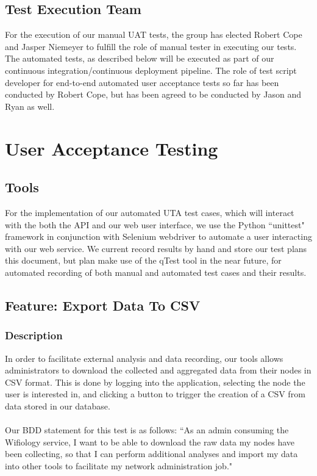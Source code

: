 \documentclass[]{article}
\begin{document}
	\subsection{Test Execution Team}
	
    For the execution of our manual UAT tests, the group has elected Robert Cope and Jasper Niemeyer to
    fulfill the role of manual tester in executing our tests. The automated tests, as described below will
    be executed as part of our continuous integration/continuous deployment pipeline. The role of test
    script developer for end-to-end automated user acceptance tests so far has been conducted by Robert Cope,
    but has been agreed to be conducted by Jason and Ryan as well.
	
	\section{User Acceptance Testing}
	\subsection{Tools}
	For the implementation of our automated UTA test cases, which will interact with the both the API and our web user interface,
	we use the Python ``unittest" framework in conjunction with Selenium webdriver to automate a user interacting with our
	web service. We current record results by hand and store our test plans this document, but plan make use of the qTest
	tool in the near future, for automated recording of both manual and automated test cases and their results.
	
	\subsection{Feature: Export Data To CSV}
	\subsubsection{Description}
    In order to facilitate external analysis and data recording, our tools allows administrators to download the collected
    and aggregated data from their nodes in CSV format. This is done by logging into the application, selecting the node
    the user is interested in, and clicking a button to trigger the creation of a CSV from data stored in our database.
    
    \paragraph{}
    Our BDD statement for this test is as follows: ``As an admin consuming the Wifiology service, I want to be able to download the
    raw data my nodes have been collecting, so that I can perform additional analyses and import my data into other tools
    to facilitate my network administration job."
	
\end{document}
